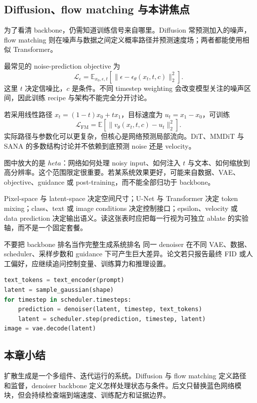 \subsection{Diffusion、flow matching 与本讲焦点}

为了看清 backbone，仍需知道训练信号来自哪里。Diffusion 常预测加入的噪声，flow matching 则在噪声与数据之间定义概率路径并预测速度场；两者都能使用相似 Transformer。


最常见的 noise-prediction objective 为
\[
\mathcal L_{\epsilon}
=\mathbb E_{x_0,\epsilon,t}
\left[\|\epsilon-\epsilon_\theta(x_t,t,c)\|_2^2\right].
\]
这里 $t$ 决定信噪比，$c$ 是条件。不同 timestep weighting 会改变模型关注的噪声区间，因此训练 recipe 与架构不能完全分开讨论。


若采用线性路径 $x_t=(1-t)x_0+t x_1$，目标速度为 $u_t=x_1-x_0$，可训练
\[
\mathcal L_{\mathrm{FM}}
=\mathbb E\left[\|v_\theta(x_t,t,c)-u_t\|_2^2\right].
\]
实际路径与参数化可以更复杂，但核心是网络预测局部流向。DiT、MMDiT 与 SANA 的多数结构讨论并不依赖到底预测 noise 还是 velocity。


图中放大的是 $	heta$：网络如何处理 noisy input、如何注入 $t$ 与文本、如何缩放到高分辨率。这个范围限定很重要。若某系统效果更好，可能来自数据、VAE、objective、guidance 或 post-training，而不能全部归功于 backbone。


Pixel-space 与 latent-space 决定空间尺寸；U-Net 与 Transformer 决定 token mixing；class、text 或 image conditions 决定控制接口；epsilon、velocity 或 data prediction 决定输出语义。读这张表时应把每一行视为可独立 ablate 的实验轴，而不是一个固定套餐。

\begin{warningbox}{不要把 backbone 排名当作完整生成系统排名}
同一 denoiser 在不同 VAE、数据、scheduler、采样步数和 guidance 下可产生巨大差异。论文若只报告最终 FID 或人工偏好，应继续追问控制变量、训练算力和推理设置。
\end{warningbox}

\begin{lstlisting}[language=Python,caption={Text-to-image 扩散系统的一次简化采样流程}]
text_tokens = text_encoder(prompt)
latent = sample_gaussian(shape)
for timestep in scheduler.timesteps:
    prediction = denoiser(latent, timestep, text_tokens)
    latent = scheduler.step(prediction, timestep, latent)
image = vae.decode(latent)
\end{lstlisting}

\subsection{本章小结}

扩散生成是一个多组件、迭代运行的系统。Diffusion 与 flow matching 定义路径和监督，denoiser backbone 定义怎样处理状态与条件。后文只替换蓝色网络模块，但会持续检查端到端速度、训练配方和证据边界。

